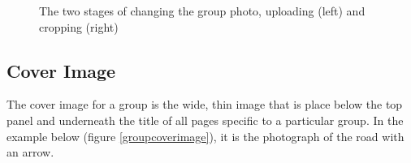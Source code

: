 \documentclass[10pt]{article}
\begin{document}
\begin{figure}[h]
    \caption{The two stages of changing the group photo, uploading (left) and cropping (right)}
    \label{groupphoto}
\end{figure}

\subsection{Cover Image}

\begin{flushleft}
The cover image for a group is the wide, thin image that is place below the top panel and underneath the title of all pages specific to a particular group.  In the example below (figure \ref{groupcoverimage}), it is the photograph of the road with an arrow.  
\end{flushleft}
\end{document}

